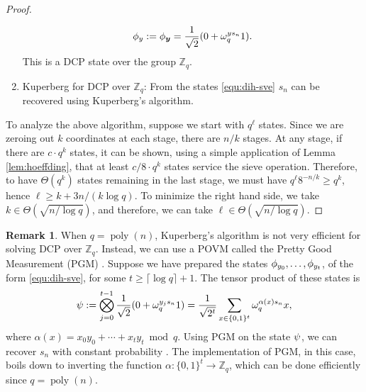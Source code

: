 \documentclass[11pt]{article}
\theoremstyle{plain}
\theoremstyle{definition}
\newtheorem*{remark}{Remark}
\DeclareMathOperator{\poly}{poly}
\let\ket\relax
\DeclarePairedDelimiter{\ket}{\lvert}{\rangle}
\def\Z{\mathbb{Z}}
\begin{document}
\begin{proof}
\begin{enumerate}[leftmargin = *, font = \bfseries]
    \begin{equation}
        \label{equ:dih-sve}
        \ket{\phi_y} := \ket{\phi_{\bm{y}}} = \frac{1}{\sqrt{2}}(\ket{0} + \omega_q^{ys_n}\ket{1}).
    \end{equation}
    This is a DCP state over the group $\Z_q$.
    \item Kuperberg for DCP over $\Z_q$: From the states \eqref{equ:dih-sve} $s_n$ can be recovered using Kuperberg's algorithm.
    \end{enumerate}
    To analyze the above algorithm, suppose we start with $q^\ell$ states. Since we are zeroing out $k$ coordinates at each stage, there are $n / k$ stages. At any stage, if there are $c \cdot q^k$ states, it can be shown, using a simple application of Lemma \ref{lem:hoeffding}, that at least $c / 8 \cdot q^k$ states service the sieve operation. Therefore, to have $\Theta(q^k)$ states remaining in the last stage, we must have $q^\ell 8^{-n / k} \ge q^k$, hence $\ell \ge k + 3n / (k\log q)$. To minimize the right hand side, we take $k \in \Theta(\sqrt{n / \log q})$, and therefore, we can take $\ell \in \Theta(\sqrt{n / \log q})$.
\end{proof}
\begin{remark}
    When $q = \poly(n)$, Kuperberg's algorithm is not very efficient for solving DCP over $\Z_q$. Instead, we can use a POVM called the Pretty Good Measurement (PGM) \cite{hausladen1994pretty}. Suppose we have prepared the states $\ket{\phi_{y_0}}, \dots, \ket{\phi_{y_t}}$, of the form \eqref{equ:dih-sve}, for some $t \ge \lceil \log q \rceil + 1$. The tensor product of these states is
    \[ \ket{\psi} := \bigotimes_{j = 0}^{t - 1} \frac{1}{\sqrt{2}}(\ket{0} + \omega_q^{y_js_n}\ket{1}) = \frac{1}{\sqrt{2^t}} \sum_{x \in \{0, 1\}^t} \omega_q^{\alpha(x)s_n} \ket{x}, \]
    where $\alpha(x) = x_0y_0 + \cdots + x_ty_t \bmod q$. Using PGM on the state $\ket{\psi}$, we can recover $s_n$ with constant probability \cite{bacon2005optimal}. The implementation of PGM, in this case, boils down to inverting the function $\alpha: \{0, 1\}^t \rightarrow \Z_q$, which can be done efficiently since $q = \poly(n)$.   
\end{remark}










\end{document}
